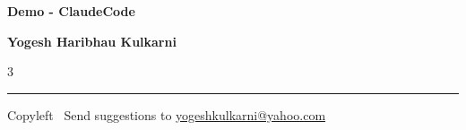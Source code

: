 \documentclass[8pt,landscape]{article}
\begin{document}
\footnotesize


\begin{center}
{\Large{\textbf{Demo - ClaudeCode}}}  

\textbf{Yogesh Haribhau Kulkarni}
\end{center}

\begin{multicols}{3}

\end{multicols}

\rule{\linewidth}{0.25pt}
\scriptsize
Copyleft \textcopyleft\  Send suggestions to 
\href{http://www.yogeshkulkarni.com}{yogeshkulkarni@yahoo.com}
\end{document}
